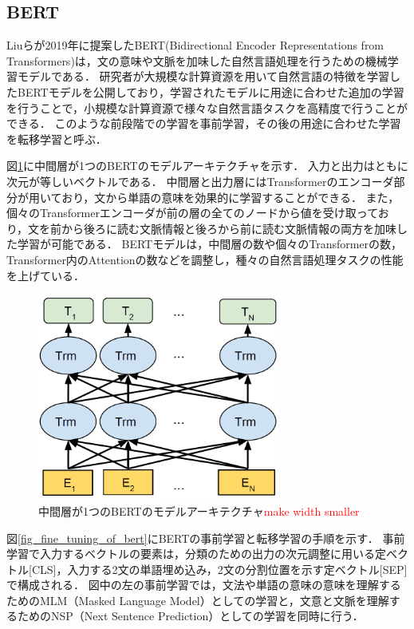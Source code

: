 \documentclass[12pt,a4j]{jreport}
\begin{document}

\subsection{BERT}
Liuらが2019年に提案したBERT(Bidirectional Encoder Representations from Transformers)は，文の意味や文脈を加味した自然言語処理を行うための機械学習モデルである\cite{aurellen20}\cite{devlin_bert_2019}．
研究者が大規模な計算資源を用いて自然言語の特徴を学習したBERTモデルを公開しており，学習されたモデルに用途に合わせた追加の学習を行うことで，小規模な計算資源で様々な自然言語タスクを高精度で行うことができる．
このような前段階での学習を事前学習，その後の用途に合わせた学習を転移学習と呼ぶ．

図\ref{fig_bert}に中間層が1つのBERTのモデルアーキテクチャを示す．
入力と出力はともに次元が等しいベクトルである．
中間層と出力層にはTransformerのエンコーダ部分が用いており，文から単語の意味を効果的に学習することができる．
また，個々のTransformerエンコーダが前の層の全てのノードから値を受け取っており，文を前から後ろに読む文脈情報と後ろから前に読む文脈情報の両方を加味した学習が可能である．
BERTモデルは，中間層の数や個々のTransformerの数，Transformer内のAttentionの数などを調整し，種々の自然言語処理タスクの性能を上げている．

\begin{figure}[H]
  \centering
  \includegraphics[keepaspectratio, width=80mm]{img/bert.png}
  \caption{中間層が1つのBERTのモデルアーキテクチャ\protect\footnotemark[4]
  \textcolor{red}{make width smaller}
  }
  \label{fig_bert}
\end{figure}

図\ref{fig_fine_tuning_of_bert}にBERTの事前学習と転移学習の手順を示す．
事前学習で入力するベクトルの要素は，分類のための出力の次元調整に用いる定ベクトル[CLS]，入力する2文の単語埋め込み，2文の分割位置を示す定ベクトル[SEP]で構成される．
図中の左の事前学習では，文法や単語の意味の意味を理解するためのMLM（Masked Language Model）としての学習と，文意と文脈を理解するためのNSP（Next Sentence Prediction）としての学習を同時に行う．
\end{document}
